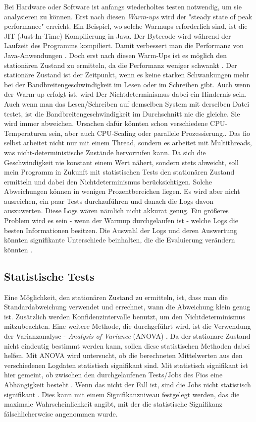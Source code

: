 \documentclass{article}
\begin{document}
Bei Hardware oder Software ist anfangs wiederholtes testen notwendig, um sie analysieren zu können. Erst nach diesen \textit{Warm-ups} wird der "steady state of peak performance" erreicht. Ein Beispiel, wo solche Warmups erforderlich sind, ist die JIT (Just-In-Time) Kompilierung in Java. Der Bytecode wird während der Laufzeit des Programms kompiliert. Damit verbessert man die Performanz von Java-Anwendungen \cite{jit}. Doch erst nach diesen Warm-Ups ist es möglich den stationären Zustand zu ermitteln, da die Performanz weniger schwankt \cite{vmsHotandCold}.
Der stationäre Zustand ist der Zeitpunkt, wenn es keine starken Schwankungen mehr bei der Bandbreitengeschwindigkeit im Lesen oder im Schreiben gibt. Auch wenn der Warm-up erfolgt ist, wird
Der Nichtdeterminismus dabei ein Hindernis sein.
Auch wenn man das Lesen/Schreiben auf demselben System mit derselben Datei testet, ist die Bandbreitengeschwindigkeit im Durchschnitt nie die gleiche. Sie wird immer abweichen.
Ursachen dafür könnten schon verschiedene CPU-Temperaturen sein, aber auch CPU-Scaling oder parallele Prozessierung.\cite{stasticsInPerformance}.
Das fio selbst arbeitet nicht nur mit einem Thread, sondern es arbeitet mit Multithreads, was nicht-deterministische Zustände hervorrufen kann.
Da sich die Geschwindigkeit nie konstant einem Wert nähert, sondern stets abweicht, soll mein Programm in Zukunft mit statistischen Tests den stationären Zustand ermitteln und dabei den Nichtdeterminismus berücksichtigen.
Solche Abweichungen können in wenigen Prozentbereichen liegen. 
Es wird aber nicht ausreichen, ein paar Tests durchzuführen und danach die Logs davon auszuwerten. Diese Logs wären nämlich nicht akkurat genug.
 Ein größeres Problem wird es sein - wenn der Warmup durchgelaufen ist -
welche Logs die besten Informationen besitzen. 
Die Auswahl der Logs und deren Auswertung könnten signifikante Unterschiede beinhalten, die die Evaluierung verändern könnten \cite{whenStopPerformanceTest}.

\subsection{Statistische Tests}

Eine Möglichkeit, den stationären Zustand zu ermitteln, ist, dass man die Standardabweichung verwendet und errechnet, wann die Abweichung klein genug ist. Zusätzlich werden Konfidenzintervalle benutzt, um den Nichtdeterminismus mitzubeachten. Eine weitere Methode, die durchgeführt wird, ist die Verwendung der Varianzanalyse - \textit{Analysis of Variance} (ANOVA) \cite{stasticsInPerformance}.
Da der stationare Zustand nicht eindeutig bestimmt werden kann, sollen diese statistischen Methoden dabei helfen.
Mit ANOVA wird untersucht, ob die berechneten Mittelwerten aus den verschiedenen Logdaten statistisch signifikant sind.
Mit statistisch signifikant ist hier gemeint, ob zwischen den durchgelaufenen Tests/Jobs des Fios eine Abhängigkeit besteht \cite{statistischeSigni}. Wenn das nicht der Fall ist, sind die Jobs nicht statistisch signifikant \cite{posthoc}. Dies kann mit einem Signifikanzniveau festgelegt werden, das die maximale Wahrscheinlichkeit angibt, mit der die statistische Signifikanz fälschlicherweise angenommen wurde.
\end{document}
